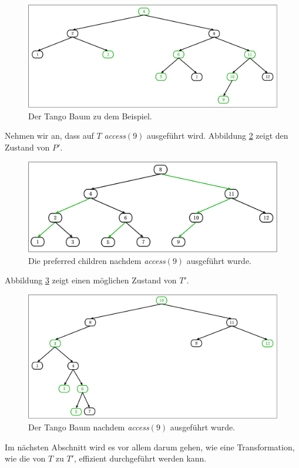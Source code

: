 \documentclass[a4paper,12pt]{article}
\begin{document}
\begin{figure}[H]
	\centering
	\includegraphics[width=1\textwidth]{Medien/Tango/Tangobaum}
	\caption{Der Tango Baum zu dem Beispiel. }
	\label{fig:Tangobaum}
\end{figure}
\noindent Nehmen wir an, dass auf $T$ \textit{access}$\left(9\right)$ ausgeführt wird. Abbildung \ref{fig:prefChilds2} zeigt den Zustand von $P'$.

\begin{figure}[H]
	\centering
	\includegraphics[width=1\textwidth]{Medien/Tango/prefChilds2}
	\caption{Die preferred children nachdem  \textit{access}$\left(9\right)$ ausgeführt wurde. }
	\label{fig:prefChilds2}
\end{figure}

\noindent Abbildung \ref{fig:Tangobaum2} zeigt einen möglichen Zustand von $T'$.
\begin{figure}[H]
	\centering
	\includegraphics[width=1\textwidth]{Medien/Tango/Tangobaum2}
	\caption{Der Tango Baum nachdem  \textit{access}$\left(9\right)$ ausgeführt wurde. }
	\label{fig:Tangobaum2}
\end{figure}
\noindent Im nächsten Abschnitt wird es vor allem darum gehen, wie eine Transformation, wie die von $T$ zu $T'$, effizient durchgeführt werden kann.
\end{document}
